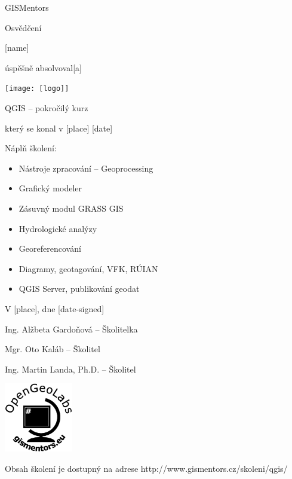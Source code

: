 \documentclass[12pt, a4paper]{letter}
\begin{document}
\pagestyle{empty}
\begin{center}

{\Large GISMentors}

{\Huge Osvědčení}

{\Large [name]}

úspěšně absolvoval[a]

\texttt{[image: [logo]]}

{\Large QGIS -- pokročilý kurz}

který se konal v [place] [date]
\end{center}

Náplň školení:

\begin{itemize}
    \item Nástroje zpracování -- Geoprocessing
    \item Grafický modeler
    \item Zásuvný modul GRASS GIS
    \item Hydrologické analýzy
    \item Georeferencování
    \item Diagramy, geotagování, VFK, RÚIAN
    \item QGIS Server, publikování geodat
\end{itemize}

\vfill
\parbox{7cm}{

    V [place], dne [date-signed]\\

\vfill

    Ing. Alžbeta Gardoňová -- Školitelka\\

\vfill
    
    Mgr. Oto Kaláb -- Školitel \\

\vfill
    
    Ing. Martin Landa, Ph.D. -- Školitel

}
\hfill
\parbox{3cm}{
    \includegraphics[width=3cm]{../images/placka.eps}
}


\begin{center}
{\footnotesize Obsah školení je dostupný na adrese
http://www.gismentors.cz/skoleni/qgis/}
\end{center}
\end{document}
